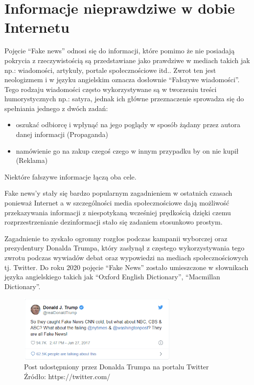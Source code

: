 \chapter{Informacje nieprawdziwe w dobie Internetu}
Pojęcie ``Fake news'' odnosi się do 
informacji, które pomimo że nie posiadają pokrycia z rzeczywistością są 
przedstawiane jako prawdziwe w mediach takich jak np.: wiadomości, artykuły, 
portale społecznościowe itd.. 
Zwrot ten jest neologizmem i w języku angielskim oznacza dosłownie ``Fałszywe wiadomości''.
Tego rodzaju wiadomości często wykorzystywane są w tworzeniu treści humorystycznych 
np.: satyra, jednak ich główne przeznaczenie sprowadza się do spełniania jednego z dwóch zadań:
\begin{itemize}
    \item oszukać odbiorcę i wpłynąć na jego poglądy w sposób żądany przez autora danej informacji (Propaganda)
    \item namówienie go na zakup czegoś czego w innym przypadku by on nie kupił (Reklama)
\end{itemize} 
Niektóre fałszywe informacje łączą oba cele.

Fake news'y stały się bardzo popularnym zagadnieniem w ostatnich czasach ponieważ
Internet a w szczególności media społecznościowe dają możliwość przekazywania
informacji z niespotykaną wcześniej prędkością dzięki czemu rozprzestrzenianie 
dezinformacji stało się zadaniem stosunkowo prostym.

Zagadnienie to zyskało ogromny rozgłos podczas kampanii wyborczej oraz
prezydentury Donalda Trumpa, który zasłynął z częstego wykorzystywania 
tego zwrotu podczas wywiadów debat oraz wypowiedzi na mediach społecznościowych
tj. Twitter.
Do roku 2020 pojęcie ``Fake News'' zostało umieszczone w słownikach języka angielskiego
takich jak ``Oxford English Dictionary'', ``Macmillan Dictionary''.
\begin{figure}[h!]
    \centering
    \includegraphics[width=0.7\textwidth]{./Img/Trump-Fake-News.png}
    \caption{Post udostępniony przez Donalda Trumpa na portalu Twitter Źródło: https://twitter.com/}
\end{figure}

